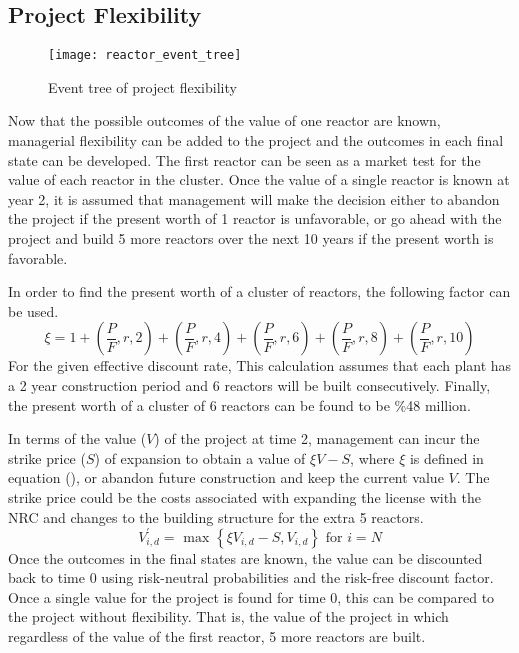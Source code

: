 \subsection{Project Flexibility}

\begin{figure}
\centering
\texttt{[image: reactor\_event\_tree]}
\caption{Event tree of project flexibility}
\end{figure}

Now that the possible outcomes of the value of one reactor are known, managerial flexibility can be added to the project and the outcomes in each final state can be developed.  The first reactor can be seen as a market test for the value of each reactor in the cluster.  Once the value of a single reactor is known at year 2, it is assumed that management will make the decision either to abandon the project if the present worth of 1 reactor is unfavorable, or go ahead with the project and build 5 more reactors over the next 10 years if the present worth is favorable.    



  In order to find the present worth of a cluster of reactors, the following factor can be used.
\begin{equation}
\xi = 1 + (\frac{P}{F},r,2)  + (\frac{P}{F},r,4)  + (\frac{P}{F},r,6)  + (\frac{P}{F},r,8)  + (\frac{P}{F},r,10)
\end{equation}
For the given effective discount rate, This calculation assumes that each plant has a 2 year construction period and 6 reactors will be built consecutively.  Finally, the present worth of a cluster of 6 reactors can be found to be \%48 million.

In terms of the value ($V$) of the project at time 2, management can incur the strike price ($S$) of expansion to obtain a value of $\xi V - S$, where $\xi$ is defined in equation (), or abandon future construction and keep the current value $V$.  The strike price could be the costs associated with expanding the license with the NRC and changes to the building structure for the extra 5 reactors.
\begin{equation}
V_{i,d}^\prime = \mbox{ max } \left\{	\xi V_{i,d} - S  , V_{i,d}      
				\right\}		
			\mbox{ for } i=N
\end{equation}
Once the outcomes in the final states are known, the value can be discounted back to time 0 using risk-neutral probabilities and the risk-free discount factor.  Once a single value for the project is found for time 0, this can be compared to the project without flexibility.  That is, the value of the project in which regardless of the value of the first reactor, 5 more reactors are built.

